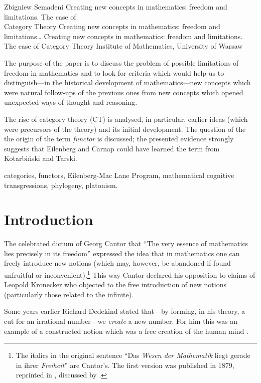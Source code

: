 \begin{artengenv}{Zbigniew Semadeni}
	{Creating new concepts in mathematics: 
	  freedom and limitations.
	  The case of\\Category Theory}
	{Creating new concepts in mathematics: 
		  freedom and limitations\ldots}
	{Creating new concepts in mathematics: 
		  freedom and limitations.\\
		  The case of Category Theory}
	{Institute of Mathematics, 
	  University of Warsaw}
	{The purpose of the paper is to discuss the problem of possible limitations 
	of freedom in mathematics and to look for criteria which would help us 
	to distinguish---in the historical development of mathematics---new concepts 
	which were natural follow-ups of the previous ones from new concepts which opened 
	unexpected ways of thought and reasoning. \par
	The rise of category theory (CT) is analysed, in particular, earlier ideas (which 
	were precursors of the theory) and its initial development. The question of the 
	the origin of the term \textit{functor} is discussed; the presented evidence strongly 
	suggests that Eilenberg and Carnap could have learned the term from Kotarbi{\'n}ski 
	and Tarski.}
	{categories, functors, Eilenberg-Mac Lane Program, mathematical 
	cognitive transgressions, phylogeny, platonism.}








\section{Introduction}
\lettrine[loversize=0.13,lines=2,lraise=-0.03,nindent=0em,findent=0.2pt]%
{T}{}he celebrated dictum of Georg Cantor that ``The very essence of mathematics lies 
precisely in its freedom'' expressed the idea that in mathematics one can freely 
introduce new notions (which may, however, be abandoned if found unfruitful or 
inconvenient).\footnote{The italics in the original sentence ``Das \textit{Wesen 
der Mathematik} liegt gerade in ihrer \textit{Freiheit}'' are Cantor's. 
The first version was published in 1879, reprinted in \parencite[p.34]{Cantor}, discussed 
by \citeauthor{Ferreiros} \parencite*[p.257]{Ferreiros}. } %
This way Cantor declared his opposition to claims of Leopold Kronecker who objected 
to the free introduction of new notions (particularly those related to the infinite). 

Some years earlier Richard Dedekind stated that---by forming, in his theory, a cut 
for an irrational number---we \textit{create} a new number. For him this was an example 
of a constructed notion which was a free creation of the human mind \parencite[\S~4]{Stetigkeit}. 


\end{artengenv}
